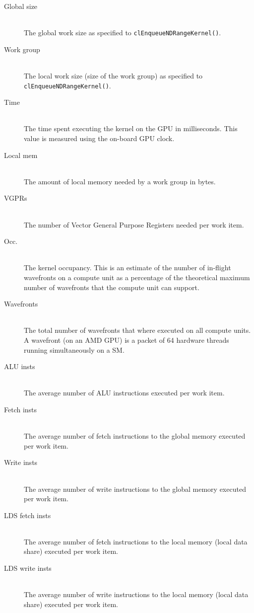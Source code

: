 \begin{table}
		\begin{description}
		   \item[Global size] \hfill \\
		   The global work size as specified to \lstinline!clEnqueueNDRangeKernel()!.
		   \item[Work group] \hfill \\
		   The local work size (size of the work group) as specified to \lstinline!clEnqueueNDRangeKernel()!.
		   \item[Time] \hfill \\
		   The time spent executing the kernel on the GPU in milliseconds. This value is measured using the on-board GPU clock.
		   \item[Local mem] \hfill \\
		   The amount of local memory needed by a work group in bytes.
		   \item[VGPRs] \hfill \\
		   The number of Vector General Purpose Registers needed per work item.
		   \item[Occ.] \hfill \\
		   The kernel occupancy. This is an estimate of the number of in-flight wavefronts on a compute unit as a percentage of the theoretical maximum number of wavefronts that the compute unit can support.
		   \item[Wavefronts] \hfill \\
		   The total number of wavefronts that where executed on all compute units. A wavefront (on an AMD GPU) is a packet of 64 hardware threads running simultaneously on a SM.
		   \item[ALU insts] \hfill \\
		   The average number of ALU instructions executed per work item.
		   \item[Fetch insts] \hfill \\
		   The average number of fetch instructions to the global memory executed per work item.
		   \item[Write insts] \hfill \\
		   The average number of write instructions to the global memory executed per work item.
		   \item[LDS fetch insts] \hfill \\
		   The average number of fetch instructions to the local memory (local data share) executed per work item.
		   \item[LDS write insts] \hfill \\
		   The average number of write instructions to the local memory (local data share) executed per work item.

\end{description}
\end{table}
